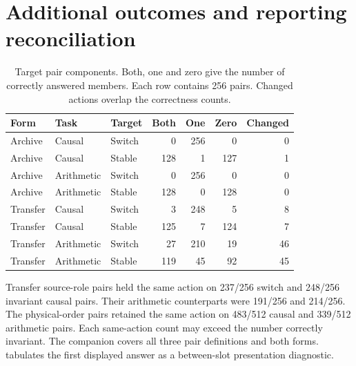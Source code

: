 \section{Additional outcomes and reporting reconciliation}
\begin{table}[htbp]\centering\small\caption{Target pair components. Both, one and zero give the number of correctly answered members. Each row contains 256 pairs. Changed actions overlap the correctness counts.}
\begin{tabular}{@{}lllrrrr@{}}\toprule
Form & Task & Target & Both & One & Zero & Changed\\\midrule
Archive&Causal&Switch&0&256&0&0\\
Archive&Causal&Stable&128&1&127&1\\
Archive&Arithmetic&Switch&0&256&0&0\\
Archive&Arithmetic&Stable&128&0&128&0\\
Transfer&Causal&Switch&3&248&5&8\\
Transfer&Causal&Stable&125&7&124&7\\
Transfer&Arithmetic&Switch&27&210&19&46\\
Transfer&Arithmetic&Stable&119&45&92&45\\\bottomrule
\end{tabular}\end{table}
Transfer source-role pairs held the same action on 237/256 switch and 248/256 invariant causal pairs. Their arithmetic counterparts were 191/256 and 214/256. The physical-order pairs retained the same action on 483/512 causal and 339/512 arithmetic pairs. Each same-action count may exceed the number correctly invariant. The companion  covers all three pair definitions and both forms.  tabulates the first displayed answer as a between-slot presentation diagnostic.

